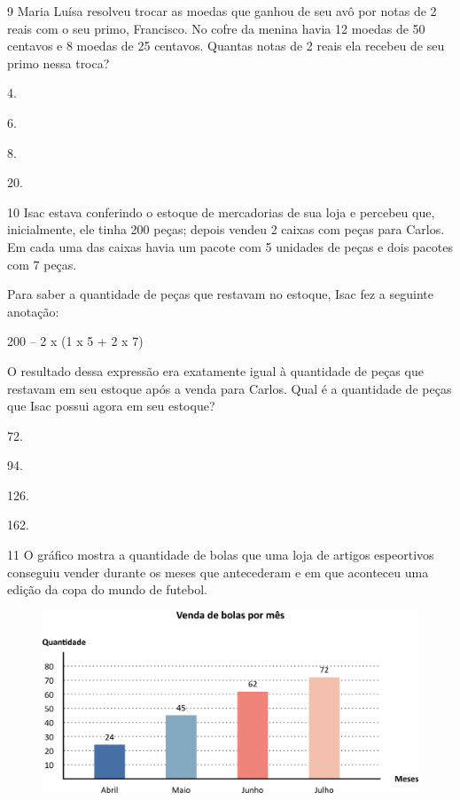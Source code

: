 \pagebreak

\num{9} Maria Luísa resolveu trocar as moedas que ganhou de seu avô por notas de
2 reais com o seu primo, Francisco. No cofre da menina havia 12 moedas de 50
centavos e 8 moedas de 25 centavos. Quantas notas de 2 reais ela recebeu
de seu primo nessa troca?

\begin{escolha}
\item
  4.
\item
  6.
\item
  8.
\item
  20.
\end{escolha}

\num{10} Isac estava conferindo o estoque de mercadorias de sua loja e percebeu que, inicialmente, ele tinha 200 peças; depois vendeu 2 caixas com peças para Carlos. Em cada uma das caixas havia um pacote com 5 unidades de peças e dois pacotes com 7 peças.

Para saber a quantidade de peças que restavam no estoque, Isac fez a seguinte anotação:

\begin{myquote}
200 -- 2 x (1 x 5 + 2 x 7)
\end{myquote}

O resultado dessa expressão era exatamente igual à quantidade de peças que restavam em seu estoque após a venda para Carlos. Qual é a quantidade de peças que Isac possui agora em seu estoque?

\begin{multicols}{2}
\begin{escolha}
\item
  72.
\item
  94.
\item
  126.
\item
  162.
\end{escolha}
\end{multicols}

\num{11} O gráfico mostra a quantidade de bolas que uma loja de artigos espeortivos conseguiu vender durante os meses que antecederam e em que aconteceu uma edição da copa do mundo de futebol.

\begin{figure}[htpb!]
\centering
\includegraphics[width=\textwidth]{./media/image105.png}
\end{figure}

